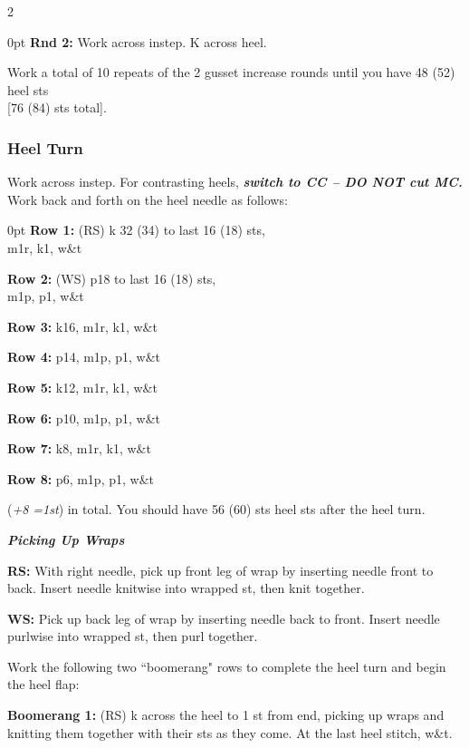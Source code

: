 \documentclass[12pt]{article}
\newcommand{\vocab}[1]{\emph{\textbf{#1}}} %
\newcommand{\rowDir}[1]{\textbf{#1:}} %
\newcommand{\increase}[1]{(\emph{+#1 
	\ifnum#1=1{st}\else{sts}\fi})}
\newenvironment{frnote}
    {%
    	\setlength{\FrameRule}{1.5pt}
    	\def\FrameCommand{\fboxrule=\FrameRule\fboxsep=\FrameSep \fcolorbox{framecolor}{shadecolor}}
    	\MakeFramed {\FrameRestore}}
    {\setlength{\FrameRule}{1pt}
	\endMakeFramed}
\newenvironment{unframed}
    {%
	\begin{addmargin}[2em]{0pt}
	\setlength{\parindent}{-2em}}
    {\vspace{1em}
	\setlength{\parindent}{0em}
	\end{addmargin}}
\begin{document}
\begin{multicols}{2}
\begin{unframed}
\rowDir{Rnd 2} Work across instep. K across heel.
\end{unframed}

Work a total of 10 repeats of the 2 gusset increase rounds until you have 48 (52) heel sts \\{} [76 (84) sts total].

\vspace{-.5em}
\subsubsection*{Heel Turn}
\vspace{-.5em}
Work across instep. For contrasting heels, \vocab{switch to CC --  DO NOT cut MC.} Work back and forth on the heel needle as follows:
\begin{unframed}
\hspace{-2em}\rowDir{Row 1} (RS) k 32 (34) to last 16 (18) sts, \\ m1r, k1, w\&t

\rowDir{Row 2} (WS) p18 to last 16 (18) sts, \\ m1p, p1, w\&t

\rowDir{Row 3} k16, m1r, k1, w\&t

\rowDir{Row 4} p14, m1p, p1, w\&t

\rowDir{Row 5} k12, m1r, k1, w\&t

\rowDir{Row 6} p10, m1p, p1, w\&t

\rowDir{Row 7} k8, m1r, k1, w\&t

\rowDir{Row 8} p6, m1p, p1, w\&t
\end{unframed}
\increase{8} in total. You should have 56 (60) sts heel sts after the heel turn.

\newpage
\begin{frnote}
\vocab{Picking Up Wraps}
\vspace{.5em}

\textbf{RS:} With right needle, pick up front leg of wrap by inserting needle front to back. Insert needle knitwise into wrapped st, then knit together. 

\textbf{WS:} Pick up back leg of wrap by inserting needle back to front. Insert needle purlwise into wrapped st, then purl together.
\end{frnote}

Work the following two ``boomerang" rows to complete the heel turn and begin the heel flap:

\rowDir{Boomerang 1} (RS) k across the heel to 1 st from end, picking up wraps and knitting them together with their sts as they come. At the last heel stitch, w\&t.


\end{multicols}
\end{document}

